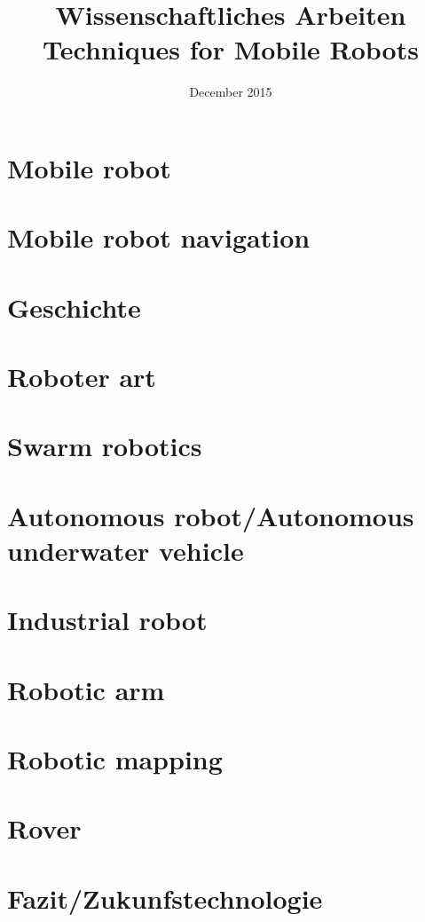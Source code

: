 \documentclass{article}
\title{Wissenschaftliches Arbeiten \\ 
Techniques for Mobile Robots}
\author{}
\date{December 2015}
\begin{document}
\maketitle

\section{Mobile robot}
\section{Mobile robot navigation}
\section{Geschichte}
\section{Roboter art}
\section{Swarm robotics}
\section{Autonomous robot/Autonomous underwater vehicle}
\section{Industrial robot}
\section{Robotic arm}
\section{Robotic mapping}
\section{Rover}
\section{Fazit/Zukunfstechnologie}
\end{document}
